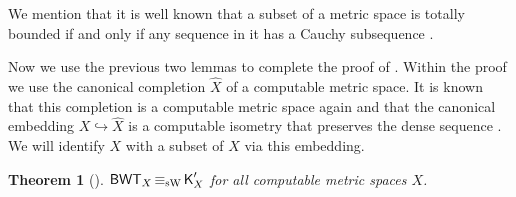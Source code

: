 \documentclass[a4paper]{amsart}
\def\into{\hookrightarrow}
\def\BWT{\text{\rm\sffamily BWT}}
\def\K{\text{\rm\sffamily K}}
\def\equivSW{\mathop{\equiv_{\mathrm{sW}}}}
\newtheorem{theorem}{Theorem}
\theoremstyle{definition}
\begin{document}
We mention that it is well known that a subset of a metric space is totally
bounded if and only if any sequence in it has a Cauchy subsequence
\cite[Exercise~4.3.A~(a)]{Eng89}.

Now we use the previous two lemmas to complete the proof of \cite[Theorem
11.2]{BGM12}. Within the proof we use the canonical completion $\hat{X}$ of a
computable metric space. It is known that this completion is a computable
metric space again and that the canonical embedding $X\into\hat{X}$ is a
computable isometry that preserves the dense sequence
\cite[Lemma~8.1.6]{Wei00}. We will identify $X$ with a subset of $\hat{X}$
via this embedding.

\begin{theorem}[{\cite[Theorem 11.2]{BGM12}}]  $\BWT_X\equivSW\K'_X$ for all computable metric spaces $X$.
\end{theorem}
\end{document}
